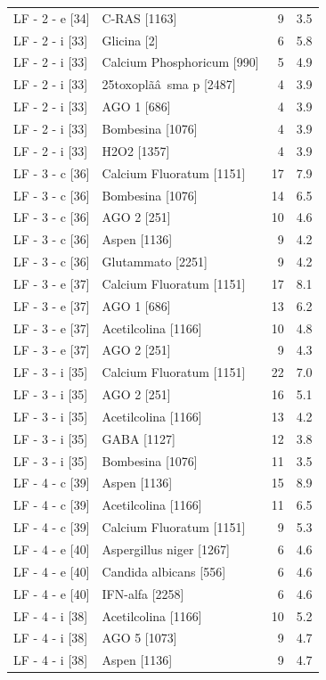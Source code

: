 \documentclass[a4paper,11pt]{article}
\begin{document}
\begin{footnotesize}
\begin{longtable}{p{3.5cm}p{7.5cm}rr}
LF - 2 - e [34] & C-RAS [1163] & 9 & 3.5 \\
LF - 2 - i [33] & Glicina [2] & 6 & 5.8 \\
LF - 2 - i [33] & Calcium Phosphoricum [990] & 5 & 4.9 \\
LF - 2 - i [33] & 25toxoplãâ sma p [2487] & 4 & 3.9 \\
LF - 2 - i [33] & AGO 1 [686] & 4 & 3.9 \\
LF - 2 - i [33] & Bombesina [1076] & 4 & 3.9 \\
LF - 2 - i [33] & H2O2 [1357] & 4 & 3.9 \\
LF - 3 - c [36] & Calcium Fluoratum [1151] & 17 & 7.9 \\
LF - 3 - c [36] & Bombesina [1076] & 14 & 6.5 \\
LF - 3 - c [36] & AGO 2 [251] & 10 & 4.6 \\
LF - 3 - c [36] & Aspen [1136] & 9 & 4.2 \\
LF - 3 - c [36] & Glutammato [2251] & 9 & 4.2 \\
LF - 3 - e [37] & Calcium Fluoratum [1151] & 17 & 8.1 \\
LF - 3 - e [37] & AGO 1 [686] & 13 & 6.2 \\
LF - 3 - e [37] & Acetilcolina [1166] & 10 & 4.8 \\
LF - 3 - e [37] & AGO 2 [251] & 9 & 4.3 \\
LF - 3 - i [35] & Calcium Fluoratum [1151] & 22 & 7.0 \\
LF - 3 - i [35] & AGO 2 [251] & 16 & 5.1 \\
LF - 3 - i [35] & Acetilcolina [1166] & 13 & 4.2 \\
LF - 3 - i [35] & GABA [1127] & 12 & 3.8 \\
LF - 3 - i [35] & Bombesina [1076] & 11 & 3.5 \\
LF - 4 - c [39] & Aspen [1136] & 15 & 8.9 \\
LF - 4 - c [39] & Acetilcolina [1166] & 11 & 6.5 \\
LF - 4 - c [39] & Calcium Fluoratum [1151] & 9 & 5.3 \\
LF - 4 - e [40] & Aspergillus niger [1267] & 6 & 4.6 \\
LF - 4 - e [40] & Candida albicans [556] & 6 & 4.6 \\
LF - 4 - e [40] & IFN-alfa [2258] & 6 & 4.6 \\
LF - 4 - i [38] & Acetilcolina [1166] & 10 & 5.2 \\
LF - 4 - i [38] & AGO 5 [1073] & 9 & 4.7 \\
LF - 4 - i [38] & Aspen [1136] & 9 & 4.7 \\

\end{longtable}
\end{footnotesize}
\end{document}
